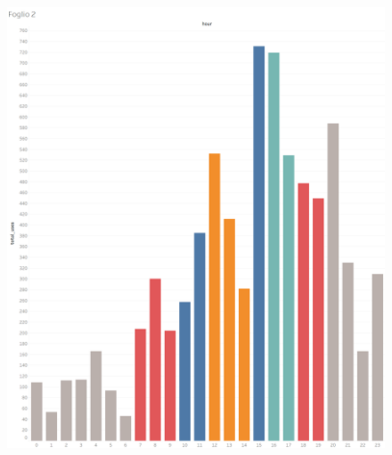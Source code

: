 \begin{figure}[H]                                                                                                                                                            
\centering                                                                                                                                                                   
\includegraphics[width=\textwidth]{images/result6}                                                                                                                                   
\label{fig:result6}                                                                                                                                                           
\end{figure}